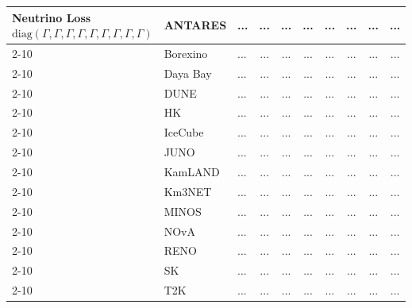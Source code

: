 \begin{table}[H]
{\begin{tabular}{|l|l|l||c|c|c|c|c|c|c|}
\multirow{13}{*}{\parbox{3.2cm}{\centering 
Neutrino Loss \\[0.5ex]
\scriptsize $\mathrm{diag}(\Gamma,\Gamma,\Gamma,\Gamma,\Gamma,\Gamma,\Gamma,\Gamma,\Gamma)$}}
        & ANTARES          & ... & ... & ... & ... & ... & ... & ... & ... \\ \cline{2-10}
        & Borexino         & ... & ... & ... & ... & ... & ... & ... & ... \\ \cline{2-10}
        & Daya Bay         & ... & ... & ... & ... & ... & ... & ... & ... \\ \cline{2-10}
        & DUNE             & ... & ... & ... & ... & ... & ... & ... & ... \\ \cline{2-10}
        & HK & ... & ... & ... & ... & ... & ... & ... & ... \\ \cline{2-10}
        & IceCube          & ... & ... & ... & ... & ... & ... & ... & ... \\ \cline{2-10}
        & JUNO             & ... & ... & ... & ... & ... & ... & ... & ... \\ \cline{2-10}
        & KamLAND          & ... & ... & ... & ... & ... & ... & ... & ... \\ \cline{2-10}
        & Km3NET           & ... & ... & ... & ... & ... & ... & ... & ... \\ \cline{2-10}
        & MINOS            & ... & ... & ... & ... & ... & ... & ... & ... \\ \cline{2-10}
        & NOvA             & ... & ... & ... & ... & ... & ... & ... & ... \\ \cline{2-10}
        & RENO             & ... & ... & ... & ... & ... & ... & ... & ... \\ \cline{2-10}
        & SK               & ... & ... & ... & ... & ... & ... & ... & ... \\ \cline{2-10}
        & T2K              & ... & ... & ... & ... & ... & ... & ... & ... \\ \hline \hline



\end{tabular}}
\end{table}
